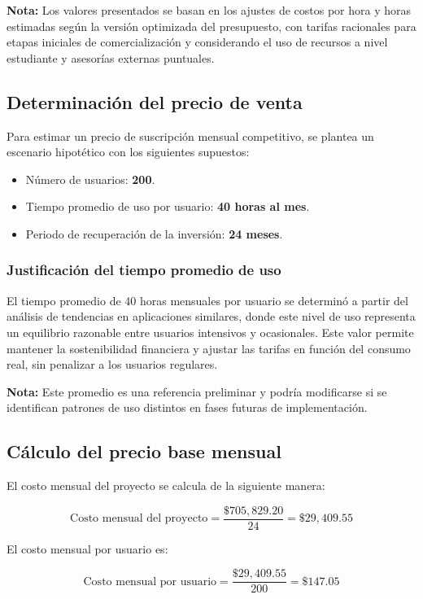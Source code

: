 \textbf{Nota:} Los valores presentados se basan en los ajustes de costos por hora y horas estimadas según la versión optimizada del presupuesto, con tarifas racionales para etapas iniciales de comercialización y considerando el uso de recursos a nivel estudiante y asesorías externas puntuales.

\subsection{Determinación del precio de venta}

Para estimar un precio de suscripción mensual competitivo, se plantea un escenario hipotético con los siguientes supuestos:
\begin{itemize}
	\item Número de usuarios: \textbf{200}.
	\item Tiempo promedio de uso por usuario: \textbf{40 horas al mes}.
	\item Periodo de recuperación de la inversión: \textbf{24 meses}.
\end{itemize}

\subsubsection{Justificación del tiempo promedio de uso}

El tiempo promedio de 40 horas mensuales por usuario se determinó a partir del análisis de tendencias en aplicaciones similares, donde este nivel de uso representa un equilibrio razonable entre usuarios intensivos y ocasionales. Este valor permite mantener la sostenibilidad financiera y ajustar las tarifas en función del consumo real, sin penalizar a los usuarios regulares.

\textbf{Nota:} Este promedio es una referencia preliminar y podría modificarse si se identifican patrones de uso distintos en fases futuras de implementación.

\subsection{Cálculo del precio base mensual}

El costo mensual del proyecto se calcula de la siguiente manera:

\[
\text{Costo mensual del proyecto} = \frac{\$705,829.20}{24} = \$29,409.55
\]

El costo mensual por usuario es:

\[
\text{Costo mensual por usuario} = \frac{\$29,409.55}{200} = \$147.05
\]

